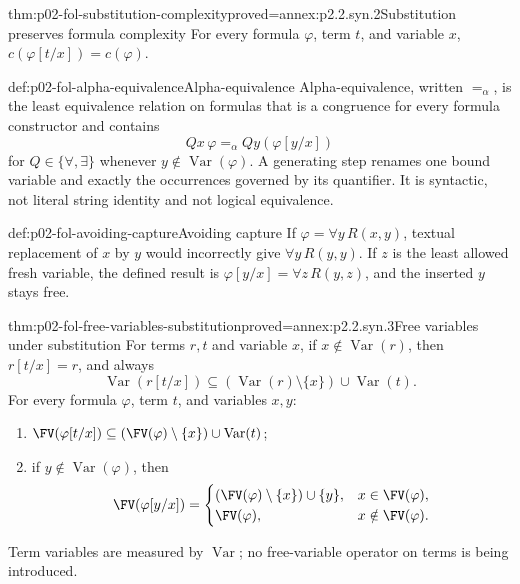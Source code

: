 \begin{hblemma}{thm:p02-fol-substitution-complexity}{proved=annex:p2.2.syn.2}{Substitution preserves formula complexity}
For every formula \(\varphi\), term \(t\), and variable \(x\),
\(c(\varphi[t/x])=c(\varphi)\).
\end{hblemma}

\begin{hbdefinition}{def:p02-fol-alpha-equivalence}{Alpha-equivalence}
Alpha-equivalence, written \(=_{\alpha}\), is the least equivalence relation
on formulas that is a congruence for every formula constructor and contains
\[
 Qx\,\varphi =_{\alpha} Qy(\varphi[y/x])
\]
for \(Q\in\{\forall,\exists\}\) whenever
\(y\notin\operatorname{Var}(\varphi)\).  A generating step renames one bound
variable and exactly the occurrences governed by its quantifier.  It is
syntactic, not literal string identity and not logical equivalence.
\end{hbdefinition}

\begin{hbexample}{def:p02-fol-avoiding-capture}{Avoiding capture}
If \(\varphi=\forall y\,R(x,y)\), textual replacement of \(x\) by \(y\)
would incorrectly give \(\forall y\,R(y,y)\).  If \(z\) is the least allowed
fresh variable, the defined result is
\(\varphi[y/x]=\forall z\,R(y,z)\), and the inserted \(y\) stays free.
\end{hbexample}

\begin{hblemma}{thm:p02-fol-free-variables-substitution}{proved=annex:p2.2.syn.3}{Free variables under substitution}
For terms \(r,t\) and variable \(x\), if
\(x\notin\operatorname{Var}(r)\), then \(r[t/x]=r\), and always
\[
 \operatorname{Var}(r[t/x])\subseteq
 (\operatorname{Var}(r)\setminus\{x\})\cup\operatorname{Var}(t).
\]
For every formula \(\varphi\), term \(t\), and variables \(x,y\):
\begin{enumerate}
 \item \(\FV(\varphi[t/x])\subseteq
 (\FV(\varphi)\setminus\{x\})\cup\operatorname{Var}(t)\);
 \item if \(y\notin\operatorname{Var}(\varphi)\), then
 \[
 \FV(\varphi[y/x])=
 \begin{cases}
  (\FV(\varphi)\setminus\{x\})\cup\{y\},&x\in\FV(\varphi),\\
  \FV(\varphi),&x\notin\FV(\varphi).
 \end{cases}
 \]
\end{enumerate}
Term variables are measured by \(\operatorname{Var}\); no free-variable
operator on terms is being introduced.
\end{hblemma}

